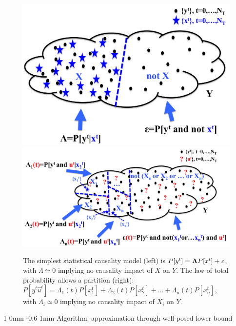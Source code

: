 \documentclass[a0,portrait]{a0poster}
\makeatletter
\renewcommand{\section}{\@startsection
        {section}%
        {1}%
        {0mm}%
        {-0.6\baselineskip}%
        {1mm}%
        {\Large\color{NTNUBlue}\bfseries}}%
\makeatother
\begin{document}
\begin{multicols}{2}
\begin{figure}[H]
    \begin{center}
        \includegraphics[width=13cm, angle=0, clip = true]{Bayesian_Causality_1.png}
        \hfil
        \includegraphics[width=17cm, angle=0, clip = true]{Bayesian_Causality_2.png}
    \caption{The simplest statistical causality model (left) is $P[y^t] = {\bf \Lambda} P[x^t] + \varepsilon$, with $\Lambda \simeq 0$ implying no causality impact of $X$ on $Y$.  The law of total probability  allows a partition (right):  $P[y^t \hat u^t] = \Lambda_1(t) P[x_1^t] + \Lambda_2(t) P[x_2^t]  + \ldots + \Lambda_n(t) P[x_n^t]$, with  $\Lambda_i \simeq 0$ implying no causality impact of  $X_i$ on $Y$.}
    \end{center}
\end{figure}



\section{Algorithm:  approximation through well-posed lower bound}
\label{approx}


\end{multicols}
\end{document}
